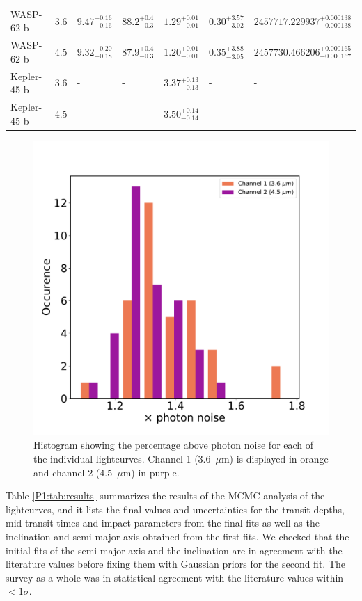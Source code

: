 {\begin{longtable}[h]{lllllll}
WASP-62 b   &               3.6 &   ${9.47}^{+0.16}_{-0.16}$ &  ${88.2}^{+0.4}_{-0.3}$ &  ${1.29}^{+0.01}_{-0.01}$ &    ${0.30}^{+3.57}_{-3.02}$ &  ${2457717.229937}^{+0.000138}_{-0.000138}$ \\
WASP-62 b   &               4.5 &   ${9.32}^{+0.20}_{-0.18}$ &  ${87.9}^{+0.4}_{-0.3}$ &  ${1.20}^{+0.01}_{-0.01}$ &    ${0.35}^{+3.88}_{-3.05}$ &  ${2457730.466206}^{+0.000165}_{-0.000167}$ \\
Kepler-45 b &               3.6 &      - &   - &  ${3.37}^{+0.13}_{-0.13}$ &       - &  - \\
Kepler-45 b &               4.5 &      - &   - &  ${3.50}^{+0.14}_{-0.14}$ &       - &  - \\
\end{longtable}
}

\begin{figure}
    \centering
    \includegraphics[width = \linewidth]{photonnoisehist.pdf}
    \caption{Histogram showing the percentage above photon noise for each of the individual lightcurves. Channel 1 (3.6~$\mu$m) is displayed in orange and channel 2 (4.5~$\mu$m) in purple.}
    \label{P1:fig:photonnoise}
\end{figure}

Table \ref{P1:tab:results} summarizes the results of the MCMC analysis of the lightcurves, and it lists the final values and uncertainties for the transit depths, mid transit times and impact parameters from the final fits as well as the inclination and semi-major axis obtained from the first fits. We checked that the initial fits of the semi-major axis and the inclination are in agreement with the literature values before fixing them with Gaussian priors for the second fit. The survey as a whole was in statistical agreement with the literature values within $<1\sigma$.

